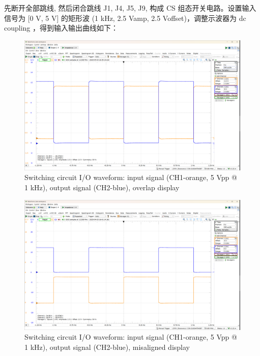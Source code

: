 \documentclass[UTF8]{article}
\begin{document}
先断开全部跳线, 然后闭合跳线 J1, J4, J5, J9, 构成 CS 组态开关电路。设置输入信号为 [0 V, 5 V] 的矩形波 (1 kHz, 2.5 Vamp, 2.5 Voffset)，调整示波器为 dc coupling ，得到输入输出曲线如下：
\begin{figure}[H]\centering
    \includegraphics[width=\columnwidth]{LCE-04-场效应管/assets/switching circuit/开关 input-output 1kHz.png}
    \caption{Switching circuit I/O waveform: input signal (CH1-orange, 5 Vpp @ 1 kHz), output signal (CH2-blue), overlap display}
\end{figure}
\begin{figure}[H]\centering
    \includegraphics[width=\columnwidth]{LCE-04-场效应管/assets/switching circuit/开关 input-output (2) 1kHz.png}
    \caption{Switching circuit I/O waveform: input signal (CH1-orange, 5 Vpp @ 1 kHz), output signal (CH2-blue), misaligned display}
\end{figure}
\end{document}
